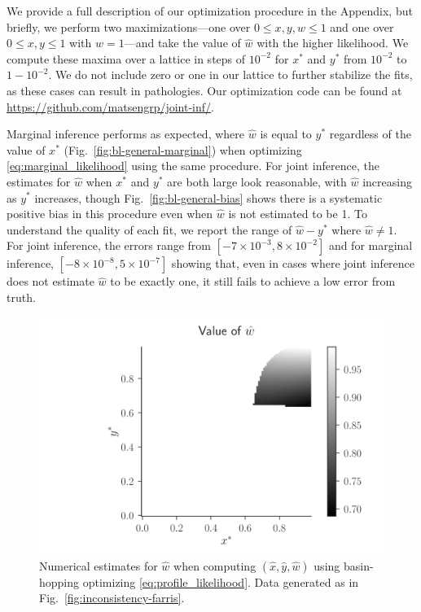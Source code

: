 \documentclass{article}
\begin{document}
We provide a full description of our optimization procedure in the Appendix, but briefly, we perform two maximizations---one over $0 \le x,y,w \le 1$ and one over $0 \le x,y \le 1$ with $w=1$---and take the value of $\hat{w}$ with the higher likelihood.
We compute these maxima over a lattice in steps of $10^{-2}$ for $x^*$ and $y^*$ from $10^{-2}$ to $1-10^{-2}$.
We do not include zero or one in our lattice to further stabilize the fits, as these cases can result in pathologies.
Our optimization code can be found at \url{https://github.com/matsengrp/joint-inf/}.

Marginal inference performs as expected, where $\hat{w}$ is equal to $y^*$ regardless of the value of $x^*$ (Fig.~\ref{fig:bl-general-marginal}) when optimizing \eqref{eq:marginal_likelihood} using the same procedure.
For joint inference, the estimates for $\hat{w}$ when $x^*$ and $y^*$ are both large look reasonable, with $\hat{w}$ increasing as $y^*$ increases, though Fig.~\ref{fig:bl-general-bias} shows there is a systematic positive bias in this procedure even when $\hat{w}$ is not estimated to be 1.
To understand the quality of each fit, we report the range of $\hat{w}-y^*$ where $\hat{w}\neq 1$.
For joint inference, the errors range from $[-7\times 10^{-3}, 8\times 10^{-2}]$ and for marginal inference, $[-8\times 10^{-8}, 5\times 10^{-7}]$ showing that, even in cases where joint inference does not estimate $\hat{w}$ to be exactly one, it still fails to achieve a low error from truth.

\begin{figure}
\centering
\includegraphics[width=\textwidth]{w-hat-empirical-01}
\caption{
    Numerical estimates for $\hat{w}$ when computing $(\hat{x}, \hat{y}, \hat{w})$ using basin-hopping \cite{Wales1997} optimizing \eqref{eq:profile_likelihood}.
    Data generated as in Fig.~\ref{fig:inconsistency-farris}.
}
\label{fig:bl-general-inconsistency}
\end{figure}
\end{document}
